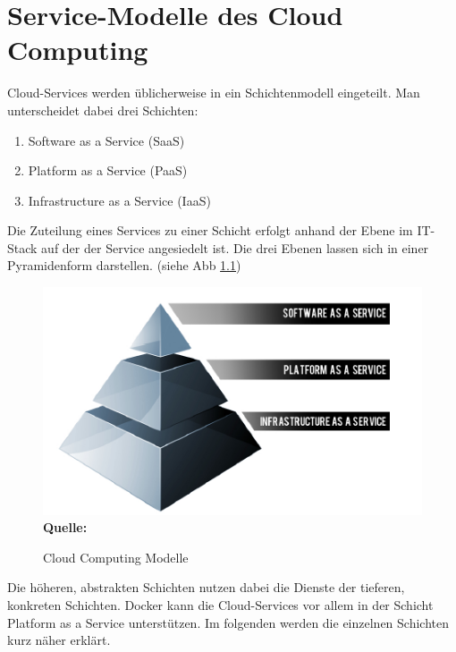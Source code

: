 \chapter{Service-Modelle des Cloud Computing}
\label{cha:service-modelle_des_cloud_computing}
Cloud-Services werden üblicherweise in ein Schichtenmodell eingeteilt. Man unterscheidet dabei drei Schichten:
\begin{enumerate}
      \itemsep0pt
      \item Software as a Service (SaaS)\cite{microsoft_cloud_2014-1}
      \item Platform as a Service (PaaS)\cite{microsoft_cloud_2014-2}
      \item Infrastructure as a Service (IaaS)\cite{microsoft_cloud_2014}
\end{enumerate}
Die Zuteilung eines Services zu einer Schicht erfolgt anhand der Ebene im IT-Stack auf der der Service angesiedelt ist.
Die drei Ebenen lassen sich in einer Pyramidenform darstellen. (siehe Abb \ref{fig:iaas_paas_saas}) 

\begin{figure}[htb]
  \centering  
  \includegraphics[scale=0.7]{img/iaas_paas_saas.png}\\
  \footnotesize\sffamily\textbf{Quelle:} \cite{kepes_understanding_2014}
  \caption{Cloud Computing Modelle}
  \label{fig:iaas_paas_saas}
\end{figure}

Die höheren, abstrakten Schichten nutzen dabei die Dienste der tieferen, konkreten Schichten.
Docker kann die Cloud-Services vor allem in der Schicht Platform as a Service unterstützen.
Im folgenden werden die einzelnen Schichten kurz näher erklärt.
